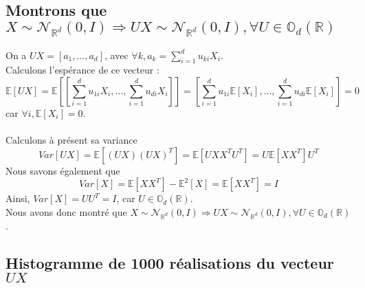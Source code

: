 \documentclass{report}
\begin{document}
		\subsection{Montrons que $X \sim \mathcal{N}_{\mathbb{R}^d}(0, I) \Rightarrow UX \sim \mathcal{N}_{\mathbb{R}^d}(0, I), \forall U \in \mathbb{O}_d(\mathbb{R})$}
			On a $UX = [a_1, ..., a_d]$, avec $\forall k, a_k = \sum\limits_{i=1}^d u_{ki}X_i$.\\
			Calculons l'espérance de ce vecteur : 
			\[ \mathbb{E}[UX] = \mathbb{E}\left[ [\sum\limits_{i=1}^d u_{1i}X_i, ..., \sum\limits_{i=1}^d u_{di}X_i]\right] = \left[ \sum\limits_{i=1}^d u_{1i}\mathbb{E}[X_i], ..., \sum\limits_{i=1}^d u_{di}\mathbb{E}[X_i]\right] = 0\]car $\forall i, \mathbb{E}[X_i] = 0$.\\
			\\
			Calculons à présent sa variance
			\[ Var[UX] = \mathbb{E}[(UX)(UX)^T] = \mathbb{E}[U X X^T U^T] = U \mathbb{E}[XX^T]U^T \]
			Nous savons également que
			\[ Var[X] = \mathbb{E}[X X^T] - \mathbb{E}^2[X] = \mathbb{E}[X X^T] = I \]
			Ainsi, $Var[X] = UU^T = I$, car $U \in \mathbb{O}_d(\mathbb{R})$.\\
			Nous avons donc montré que $X \sim \mathcal{N}_{\mathbb{R}^d}(0, I) \Rightarrow UX \sim \mathcal{N}_{\mathbb{R}^d}(0, I), \forall U \in \mathbb{O}_d(\mathbb{R})$.

		\subsection{Histogramme de 1000 réalisations du vecteur $UX$}
		
\end{document}

